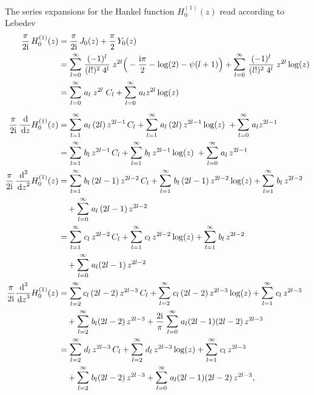 The series expansions for the Hankel function $H_0^{(1)}(z)$ read according to Lebedev  \cite{lebedev}
\begin{align*}
  \frac{\pi}{2 \ii} \, H_0^{(1)}(z)
  &= \frac{\pi}{2\ii} \, J_0(z) + \frac{\pi}{2}\, Y_0(z) \\
  &= \mathlarger{\sum}_{l = 0}^\infty \; \frac{(-1)^l}{(l!)^2 \; 4^l} \;  z^{2l} \Big( -\frac{\ii \pi}{2} - \log(2) - \psi(l + 1) \Big) 
  +  \mathlarger{\sum}_{l = 0}^\infty \; \frac{(-1)^l}{(l!)^2 \; 4^l} \;  z^{2l} \log(z) \\
  &= \mathlarger{\sum}_{l = 0}^\infty \; a_l \;  z^{2l} \; C_l 
  + \mathlarger{\sum}_{l = 0}^\infty \; a_l z^{2l} \log(z) \\[0.5em]
  \frac{\pi}{2\ii} \, \frac{\d{}}{\d z} H_0^{(1)}(z)
  &= \mathlarger{\sum}_{l = 1}^\infty \; a_l \,  (2l) \, z^{2l - 1} \, C_l 
  + \mathlarger{\sum}_{l = 1}^\infty \; a_l \, (2l)  \, z^{2l - 1} \log(z) \; 
  + \mathlarger{\sum}_{l = 0}^\infty \; a_l z^{2l - 1} \\
  &= \mathlarger{\sum}_{l = 1}^\infty \; b_l \, z^{2l - 1} \, C_l 
  + \mathlarger{\sum}_{l = 1}^\infty \; b_l \, z^{2l - 1} \log(z) \; 
  +  \mathlarger{\sum}_{l = 0}^\infty \; a_l \, z^{2l - 1} \\
  \frac{\pi}{2\ii} \, \frac{\d{}^2}{\d z^2} H_0^{(1)}(z)
  &= \mathlarger{\sum}_{l = 1}^\infty \; b_l \, (2l - 1) \, z^{2l - 2} \, C_l 
  + \mathlarger{\sum}_{l = 1}^\infty \; b_l \, (2l - 1)\, z^{2l - 2} \log(z) 
  + \mathlarger{\sum}_{l = 1}^\infty \; b_l \, z^{2l - 2} \\
  &\quad + \mathlarger{\sum}_{l = 0}^\infty \; a_l \, (2l - 1) \, z^{2l - 2} \\
  &= \mathlarger{\sum}_{l = 1}^\infty \; c_l \, z^{2l - 2} \, C_l 
  +  \mathlarger{\sum}_{l = 1}^\infty \; c_l \, z^{2l - 2} \log(z) 
  +  \mathlarger{\sum}_{l = 1}^\infty \; b_l \, z^{2l - 2} \\
  &\quad +  \mathlarger{\sum}_{l = 0}^\infty \; a_l (2l - 1) \, z^{2l - 2} \\
  \frac{\pi}{2\ii} \frac{\d{}^3}{\d z^3} H_0^{(1)}(z)
  &= \sum_{l = 2}^\infty c_l \, (2l - 2) \, z^{2l - 3} \, C_l 
  +  \mathlarger{\sum}_{l = 2}^\infty \; c_l \, (2l - 2) \, z^{2l - 3} \log(z) 
  +  \mathlarger{\sum}_{l = 1}^\infty \; c_l \, z^{2l - 3} \\
 &\quad  
  + \mathlarger{\sum}_{l = 2}^\infty \; b_l (2l - 2) \, z^{2l - 3} 
  + \frac{2 \ii}{\pi}\; \mathlarger{\sum}_{l = 0}^\infty \; a_l (2l - 1) (2l - 2) \, z^{2l - 3} \\
  &= \mathlarger{\sum}_{l = 2}^\infty \; d_l \, z^{2l - 3} \, C_l 
  + \mathlarger{\sum}_{l = 2}^\infty \; d_l \, z^{2l - 3} \log(z) 
  + \mathlarger{\sum}_{l = 1}^\infty \; c_l \, z^{2l - 3} \\
 &\quad  + \mathlarger{\sum}_{l = 2}^\infty \; b_l (2l - 2) \, z^{2l - 3} 
  + \mathlarger{\sum}_{l = 0}^\infty \; a_l (2l - 1) (2l - 2) \, z^{2l - 3} ,
\end{align*}

